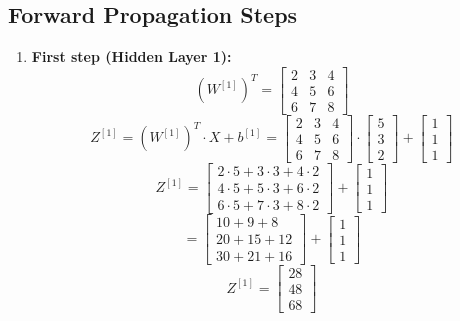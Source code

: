 \documentclass[a4paper,12pt]{article}
\begin{document}
\subsection{Forward Propagation Steps}
\begin{enumerate}
    \item \textbf{First step (Hidden Layer 1):}
    \[
    (W^{[1]})^T = \begin{bmatrix}
    2 & 3 & 4 \\
    4 & 5 & 6 \\
    6 & 7 & 8
    \end{bmatrix}
    \]
    \[
    Z^{[1]} = (W^{[1]})^T \cdot X + b^{[1]} = \begin{bmatrix}
    2 & 3 & 4 \\
    4 & 5 & 6 \\
    6 & 7 & 8
    \end{bmatrix} \cdot \begin{bmatrix} 5 \\ 3 \\ 2 \end{bmatrix} + \begin{bmatrix} 1 \\ 1 \\ 1 \end{bmatrix}
    \]
    \[
    Z^{[1]} = \begin{bmatrix}
    2 \cdot 5 + 3 \cdot 3 + 4 \cdot 2 \\
    4 \cdot 5 + 5 \cdot 3 + 6 \cdot 2 \\
    6 \cdot 5 + 7 \cdot 3 + 8 \cdot 2
    \end{bmatrix} + \begin{bmatrix} 1 \\ 1 \\ 1 \end{bmatrix}
    \]
    \[
    = \begin{bmatrix} 10 + 9 + 8 \\ 20 + 15 + 12 \\ 30 + 21 + 16 \end{bmatrix} + \begin{bmatrix} 1 \\ 1 \\ 1 \end{bmatrix}
    \]
    \[
    Z^{[1]} = \begin{bmatrix} 28 \\ 48 \\ 68 \end{bmatrix}
    \]


\end{enumerate}
\end{document}
